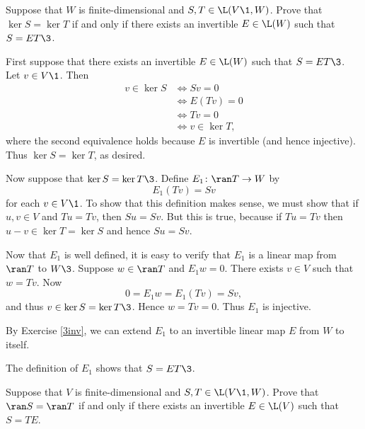 \exercise
Suppose that $W$ is finite-dimensional and $S, T \in \L(V\1, W)$. Prove that
$
\ker S = \ker T$
if and only if there exists an invertible \mbox{$E \in \L(W)$} such that $S = ET\3$. \label{1020}

\begin{Solution}
First suppose that there exists an invertible $E \in \L(W)$ such that $S = ET\3$. Let $v \in V\1$. Then
\begin{align*}
v \in \ker S &\iff S v = 0 \\
&\iff E(Tv) = 0 \\
&\iff T v = 0 \\
&\iff v \in \ker T,
\end{align*}
where the second equivalence holds because $E$ is invertible (and hence injective). Thus $\ker S = \ker T$, as desired.

Now suppose that $\ker S = \ker T\3$. Define $E_1 \colon \ran T \to W$ by
\[
E_1(T v) = S v
\]
for each $v \in V\1$. To show that this definition makes sense, we must show that if $u, v \in V$ and $T u = T v$, then $S u = S v$. But this is true, because if $Tu = Tv$ then $u - v \in \ker T= \ker S$ and hence $Su = S v$.

Now that $E_1$ is well defined, it is easy to verify that $E_1$ is a linear map from $\ran T$ to $W\3$. Suppose $w \in \ran T$ and $E_1 w = 0$. There exists $v \in V$ such that $w = Tv$. Now
\[
0 = E_1 w = E_1(Tv) = S v,
\]
and thus $v \in \ker S = \ker T\3$. Hence $w = Tv = 0$. Thus $E_1$ is injective.

By Exercise \ref{3inv}, we can extend $E_1$ to an invertible linear map $E$ from $W$ to itself.

The definition of $E_1$ shows that $S = ET\3$.
\end{Solution}

\exercise
Suppose that $V$ is finite-dimensional and $S, T \in \L(V\1, W)$. Prove that
$
\ran S = \ran T
$
if and only if there exists an invertible $E \in \L(V)$ such that $S = T E$.

